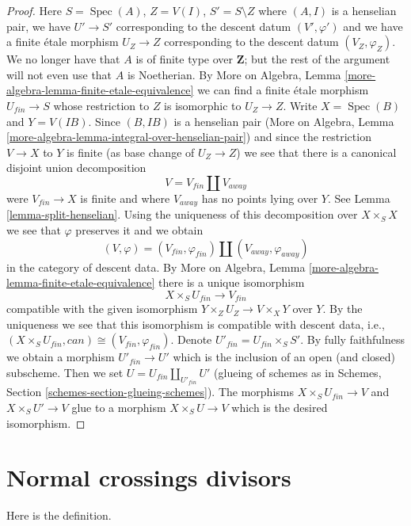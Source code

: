 \documentclass{stacks-project}
\theoremstyle{plain}
\theoremstyle{definition}
\theoremstyle{remark}
\numberwithin{equation}{subsection}
\def\Spec{\mathop{\mathrm{Spec}}}
\begin{document}
\begin{proof}
\medskip\noindent
Here $S = \Spec(A)$, $Z = V(I)$, $S' = S \setminus Z$ where
$(A, I)$ is a henselian pair, we have $U' \to S'$ corresponding
to the descent datum $(V', \varphi')$ and we have a finite \'etale
morphism $U_Z \to Z$ corresponding to the descent datum
$(V_Z, \varphi_Z)$. We no longer have that $A$ is of finite type
over $\mathbf{Z}$; but the rest of the argument will not even use
that $A$ is Noetherian.
By More on Algebra, Lemma \ref{more-algebra-lemma-finite-etale-equivalence}
we can find a finite \'etale morphism $U_{fin} \to S$ whose
restriction to $Z$ is isomorphic to $U_Z \to Z$.
Write $X = \Spec(B)$ and $Y = V(IB)$. Since $(B, IB)$ is a henselian pair
(More on Algebra, Lemma \ref{more-algebra-lemma-integral-over-henselian-pair})
and since the restriction $V \to X$ to $Y$
is finite (as base change of $U_Z \to Z$) we see that
there is a canonical disjoint union decomposition
$$
V = V_{fin} \amalg V_{away}
$$
were $V_{fin} \to X$ is finite and where $V_{away}$ has no
points lying over $Y$. See Lemma \ref{lemma-split-henselian}.
Using the uniqueness of this decomposition over $X \times_S X$
we see that $\varphi$ preserves it and we obtain
$$
(V, \varphi) = (V_{fin}, \varphi_{fin}) \amalg (V_{away}, \varphi_{away})
$$
in the category of descent data.
By More on Algebra, Lemma \ref{more-algebra-lemma-finite-etale-equivalence}
there is a unique isomorphism
$$
X \times_S U_{fin} \longrightarrow V_{fin}
$$
compatible with the given isomorphism $Y \times_Z U_Z \to V \times_X Y$
over $Y$.
By the uniqueness we see that this isomorphism is compatible
with descent data, i.e.,
$(X \times_S U_{fin}, can) \cong (V_{fin}, \varphi_{fin})$.
Denote $U'_{fin} = U_{fin} \times_S S'$. By fully faithfulness
we obtain a morphism $U'_{fin} \to U'$ which is
the inclusion of an open (and closed) subscheme.
Then we set $U = U_{fin} \amalg_{U'_{fin}} U'$ (glueing of schemes as
in Schemes, Section \ref{schemes-section-glueing-schemes}).
The morphisms $X \times_S U_{fin} \to V$ and
$X \times_S U' \to V$ glue to a morphism $X \times_S U \to V$
which is the desired isomorphism.
\end{proof}





\section{Normal crossings divisors}
\label{section-normal-crossings}

\noindent
Here is the definition.
\end{document}
